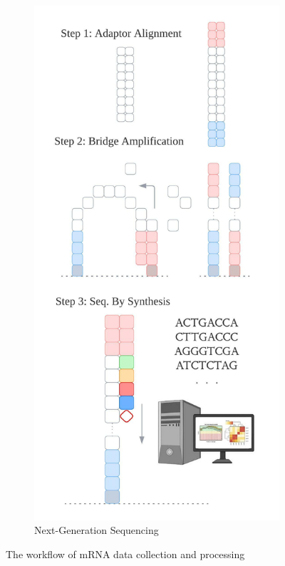 \documentclass[
11pt,notheorems,hyperref={pdfauthor=whatever}
]{beamer}
\begin{document}
\begin{frame}
\begin{figure}
        \begin{subfigure}[b]{0.3\textwidth}
            \centering
            \includegraphics[scale=0.39]{AldoFruc_NGS.jpg}
            \caption{Next-Generation Sequencing \cite{boldogkHoi2019long}}
            \label{fig: NGS}
        \end{subfigure}
        \renewcommand{\figurename}{Figure 2}
           \caption{The workflow of mRNA data collection and processing}
           \label{fig: The workflow of sample collection}
   \end{figure}
\end{frame}
\end{document}

